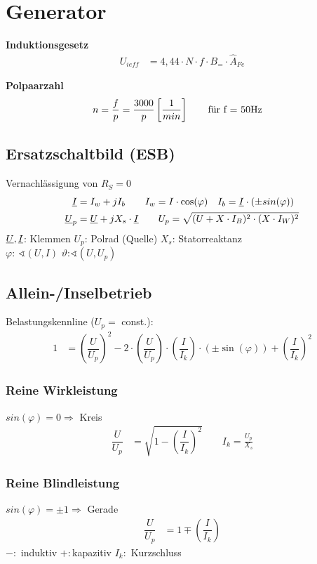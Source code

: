 \clearpage
\section{Generator}
\textbf{Induktionsgesetz}
\begin{align*}
    U_{ieff} &= 4,44 \cdot N \cdot f \cdot B_= \cdot \hat{A}_{Fe}
\end{align*}

\textbf{Polpaarzahl}
\begin{align*}
    n &=\frac{f}{p}= \dfrac{3000}{p} \left[ \frac{1}{min}\right] \qquad \textnormal{für f = 50Hz}
    \end{align*}

\subsection{Ersatzschaltbild (ESB)}
Vernachlässigung von $R_S = 0$
\begin{align*}
    \underline{I} &= I_w +jI_b \qquad I_w = I \cdot \cos(\varphi) \quad I_b = \underline{I}\cdot (\pm sin(\varphi))\\
    \underline{U}_p &= \underline{U} +jX_s \cdot \underline{I} \qquad
    U_p = \sqrt{(U+X\cdot I_B)^2 \cdot (X\cdot I_W)^2}
\end{align*}
$\underline{U}, \underline{I}$: Klemmen \quad $U_p$: Polrad (Quelle) \quad $X_s$: Statorreaktanz \\
$\varphi$: $\sphericalangle (U, I)$ \qquad $\vartheta$:$\sphericalangle (U, U_p)$

\subsection{Allein-/Inselbetrieb}
Belastungskennline ($U_p=$ const.):
\begin{align*}
    1 &= \left( \dfrac{U}{U_p} \right)^2 - 2 \cdot \left( \dfrac{U}{U_p}\right) \cdot \left( \dfrac{I}{I_k}\right) \cdot (\pm \sin(\varphi)) + \left(\dfrac{I}{I_k}\right)^2
\end{align*}
\subsubsection{Reine Wirkleistung}
$sin(\varphi) = 0 \Rightarrow$ Kreis
\begin{align*}
    \dfrac{U}{U_p} &= \sqrt{1- \left(\dfrac{I}{I_k}\right)^2} \qquad I_k = \frac{U_p}{X_s}
\end{align*}

\subsubsection{Reine Blindleistung}
$    sin(\varphi) = \pm1 \Rightarrow$ Gerade
\begin{align*}
    \dfrac{U}{U_p} &= 1 \mp \left(\dfrac{I}{I_k}\right)
\end{align*}
$- :$ induktiv \qquad $+ :$kapazitiv \qquad
$I_k :$ Kurzschluss


